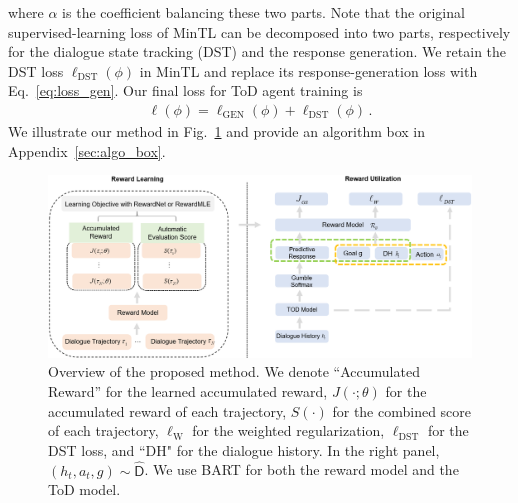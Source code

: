where $\alpha$ is the coefficient balancing these two parts.
Note that the original supervised-learning loss of MinTL \citep{mintl2020} can be decomposed into two parts, respectively for the dialogue state tracking (DST)  and the response generation.
We retain the DST loss $\ell_{\mathrm{DST}}(\phi)$ in MinTL and replace its response-generation loss with Eq.~\eqref{eq:loss_gen}.
Our final loss for ToD agent training is
\begin{align}
    \ell(\phi) = \ell_{\mathrm{GEN}}(\phi) + \ell_{\mathrm{DST}}(\phi)\,. \label{eq:final_loss}
\end{align}
We illustrate our method in Fig.~\ref{fig:pipeline} and provide an algorithm box in Appendix~\ref{sec:algo_box}.


\begin{figure}[t]
\centering
\vspace{-2mm}
\includegraphics[width=11.5cm]{Tex/fig/Dialogue_flow.PNG}
\captionsetup{font=small}
\caption{Overview of the proposed method. 
We denote ``Accumulated Reward'' for the learned accumulated reward, 
$J(\cdot;\theta)$ for the accumulated reward of each trajectory, $S(\cdot)$ for the combined score of each trajectory,
$\ell_\mathrm{W}$ for the weighted regularization, $\ell_{\mathrm{DST}}$ for the DST loss, 
and ``DH" for the dialogue history.
In the right panel, $(h_t, a_t, g)\sim \hat{\mathsf{D}}$.
We use BART 
for both the reward model and the ToD model.
}
\vspace{-1.5em}
\label{fig:pipeline}
\end{figure}


